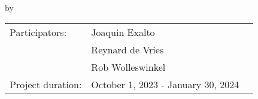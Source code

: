 \begin{titlepage}

\begin{center}

{\makeatletter
\largetitlestyle\fontsize{45}{45}\selectfont\@title
\makeatother}

{\makeatletter
\ifdefvoid{\@subtitle}{}{\titlestyle\fontsize{20}{20}\selectfont\@subtitle}
\makeatother}

\bigskip
\bigskip

by

\bigskip
\bigskip

{\makeatletter
\largetitlestyle\fontsize{25}{25}\selectfont\@author
\makeatother}


\bigskip
\bigskip

\begin{tabular}{lll}
    Participators:      & Joaquin Exalto \\
                        & Reynard de Vries \\
                        & Rob Wolleswinkel \\
    Project duration:   & October 1, 2023 - January 30, 2024 \\

\end{tabular}
\end{center}


\end{titlepage}

